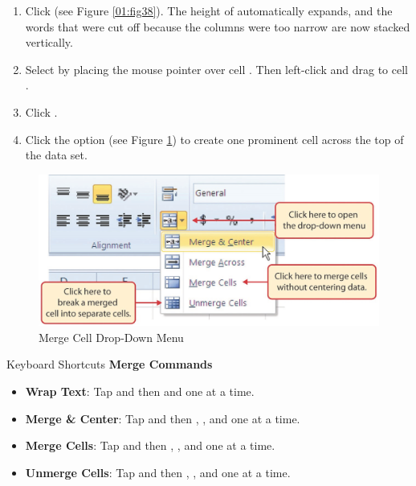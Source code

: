 \begin{enumbox}
\begin{enumerate}
		\item Click  (see Figure \ref{01:fig38}). The height of  automatically expands, and the words that were cut off because the columns were too narrow are now stacked vertically.
		\item Select  by placing the mouse pointer over cell . Then left-click and drag to cell .
		\item Click .
		\item Click the  option (see Figure \ref{01:fig39}) to create one prominent cell across the top of the data set.
	\end{enumerate}
\end{enumbox}

\begin{figure}[H]
	\centering
	\includegraphics[width=\maxwidth{.95\linewidth}]{gfx/ch01_fig39}
	\caption{Merge Cell Drop-Down Menu}
	\label{01:fig39}
\end{figure}

\begin{center}
	\begin{shtcutbox}{Keyboard Shortcuts}
		\textbf{Merge Commands}
		\\
		\begin{itemize}
			\setlength{\itemsep}{0pt}
			\setlength{\parskip}{0pt}
			\setlength{\parsep}{0pt}
			
			\item \textbf{Wrap Text}: Tap  and then  and  one at a time.
			\item \textbf{Merge \& Center}: Tap  and then , , and  one at a time.
			\item \textbf{Merge Cells}: Tap  and then , , and  one at a time.
			\item \textbf{Unmerge Cells}: Tap  and then , , and  one at a time.
			
		\end{itemize}
	\end{shtcutbox}
\end{center}

